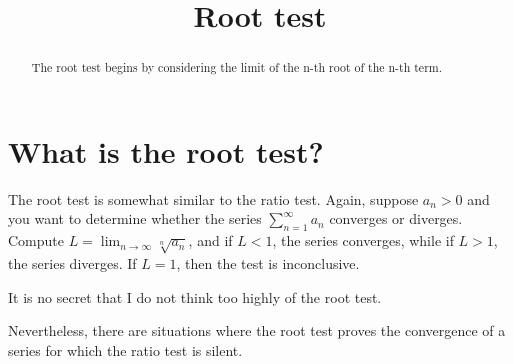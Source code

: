 \documentclass{ximera}
\title{Root test}
\begin{document}
\begin{abstract}
  The root test begins by considering the limit of the n-th root of the n-th term.
\end{abstract}

\maketitle

\section{What is the root test?}

The root test is somewhat similar to the ratio test.  Again, suppose \(a_n > 0\) and you want to determine whether the series \(\sum_{n=1}^\infty a_n\) converges or diverges.  Compute \(L = \displaystyle\lim_{n\to\infty} \sqrt[n]{a_{n}}\), and if \(L < 1\), the series converges, while if \(L > 1\), the series diverges.  If \(L = 1\), then the test is inconclusive.

It is no secret that I do not think too highly of the root test.


Nevertheless, there are situations where the root test proves the convergence of a series for which the ratio test is silent.
\end{document}
